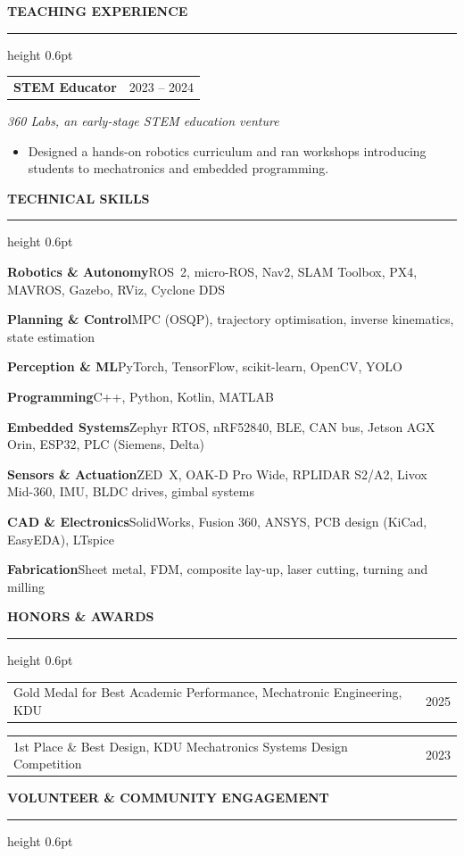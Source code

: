 \documentclass[11pt,letterpaper]{article}
\makeatletter
\renewcommand{\section}[1]{%
  \Needspace{6\baselineskip}%
  \vspace{7pt}%
  {\normalsize\bfseries\MakeUppercase{#1}}\par
  \vspace{1pt}\hrule height 0.6pt
  \vspace{3.5pt}%
}
\newcommand{\cventry}[2]{%
  \vspace{3pt}%
  \noindent\begin{tabularx}{\textwidth}{@{}X r@{}}
    #1 & #2
  \end{tabularx}\par\vspace{-0.5pt}%
}
\newcommand{\cvsub}[1]{{\itshape #1}\par\vspace{1pt}}
\newenvironment{cvlist}
  {\begin{itemize}[leftmargin=1.1em,itemsep=1pt,parsep=0pt,topsep=1.5pt,
                   label=\textendash]}
  {\end{itemize}}
\newcommand{\skill}[2]{\textbf{#1}\hspace{0.4em}#2\par\vspace{1pt}}
\makeatother
\begin{document}
\section{Teaching Experience}

\cventry{\textbf{STEM Educator}}{2023 -- 2024}
\cvsub{360 Labs, an early-stage STEM education venture}
\begin{cvlist}
  \item Designed a hands-on robotics curriculum and ran workshops introducing
        students to mechatronics and embedded programming.
\end{cvlist}

\section{Technical Skills}

\skill{Robotics \& Autonomy}{ROS~2, micro-ROS, Nav2, SLAM Toolbox, PX4, MAVROS,
  Gazebo, RViz, Cyclone DDS}
\skill{Planning \& Control}{MPC (OSQP), trajectory optimisation, inverse
  kinematics, state estimation}
\skill{Perception \& ML}{PyTorch, TensorFlow, scikit-learn, OpenCV, YOLO}
\skill{Programming}{C++, Python, Kotlin, MATLAB}
\skill{Embedded Systems}{Zephyr RTOS, nRF52840, BLE, CAN bus, Jetson AGX Orin,
  ESP32, PLC (Siemens, Delta)}
\skill{Sensors \& Actuation}{ZED~X, OAK-D Pro Wide, RPLIDAR S2/A2, Livox
  Mid-360, IMU, BLDC drives, gimbal systems}
\skill{CAD \& Electronics}{SolidWorks, Fusion 360, ANSYS, PCB design (KiCad,
  EasyEDA), LTspice}
\skill{Fabrication}{Sheet metal, FDM, composite lay-up, laser cutting, turning
  and milling}

\section{Honors \& Awards}

\cventry{Gold Medal for Best Academic Performance, Mechatronic Engineering, KDU}{2025}
\cventry{1st Place \& Best Design, KDU Mechatronics Systems Design Competition}{2023}

\section{Volunteer \& Community Engagement}
\end{document}
